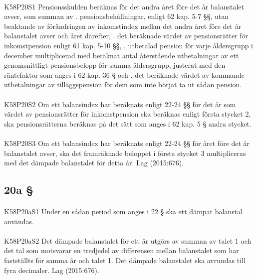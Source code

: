 \documentclass[a4paper,notitlepage,openany,10pt]{book}
\begin{document}
\paragraph*{}
{\tiny K58P20S1}
Pensionsskulden beräknas för det andra året före det år balanstalet avser, som summan av
. pensionsbehållningar, enligt 62 kap. 5-7 §§, utan beaktande av förändringen av inkomstindex mellan det andra året före det år balanstalet avser och året därefter,
. det beräknade värdet av pensionsrätter för inkomstpension enligt 61 kap. 5-10 §§,
. utbetalad pension för varje åldersgrupp i december multiplicerad med beräknat antal återstående utbetalningar av ett genomsnittligt pensionsbelopp för samma åldersgrupp, justerat med den räntefaktor som anges i 62 kap. 36 § och
. det beräknade värdet av kommande utbetalningar av tilläggspension för dem som inte börjat ta ut sådan pension.
\paragraph*{}
{\tiny K58P20S2}
Om ett balansindex har beräknats enligt 22-24 §§ för det år som värdet av pensionsrätter för inkomstpension ska beräknas enligt första stycket 2, ska pensionsrätterna beräknas på det sätt som anges i 62 kap. 5 § andra stycket.
\paragraph*{}
{\tiny K58P20S3}
Om ett balansindex har beräknats enligt 22-24 §§ för året före det år balanstalet avser, ska det framräknade beloppet i första stycket 3 multipliceras med det dämpade balanstalet för detta år.
Lag (2015:676).
\subsection*{20a §}
\paragraph*{}
{\tiny K58P20aS1}
Under en sådan period som anges i 22 § ska ett dämpat balanstal användas.
\paragraph*{}
{\tiny K58P20aS2}
Det dämpade balanstalet för ett år utgörs av summan av talet 1 och det tal som motsvarar en tredjedel av differensen mellan balanstalet som har fastställts för samma år och talet 1. Det dämpade balanstalet ska avrundas till fyra decimaler.
Lag (2015:676).
\end{document}
